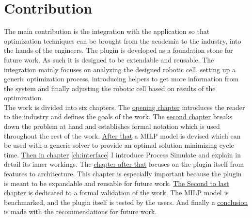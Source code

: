 \section{Contribution}

The main contribution is the integration with the application so that optimization techniques can be brought from the academia to the industry, into the hands of the engineers. The plugin is developed as a foundation stone for future work. As such it is designed to be extendable and reusable. The integration mainly focuses on analyzing the designed robotic cell, setting up a generic optimization process, introducing helpers to get more information from the system and finally adjusting the robotic cell based on results of the optimization. \\

The work is divided into six chapters. The \href{ch:introduction}{opening chapter} introduces the reader to the industry and defines the goals of the work. The \href{ch:problem_statement}{second chapter} breaks down the problem at hand and establishes formal notation which is used throughout the rest of the work. \href{ch:milp_model}{After that} a MILP model is devised which can be used with a generic solver to provide an optimal solution minimizing cycle time. \href{ch:interface}{Then in chapter} \ref{ch:interface} I introduce Process Simulate and explain in detail its inner workings. The \href{ch:integration}{chapter after that} focuses on the plugin itself from features to architecture. This chapter is especially important because the plugin is meant to be expandable and reusable for future work. \href{ch:experiments}{The Second to last chapter} is dedicated to a formal validation of the work. The MILP model is benchmarked, and the plugin itself is tested by the users. And finally a \href{ch:conclusion}{conclusion} is made with the recommendations for future work.    